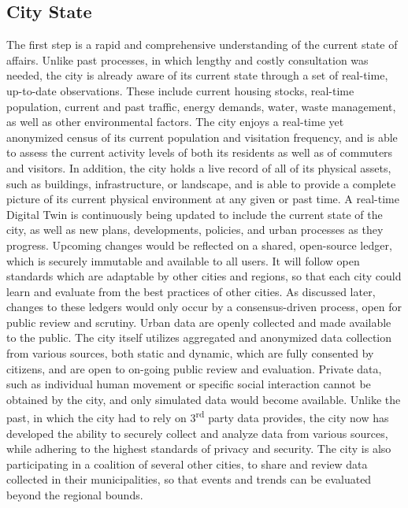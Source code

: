 {{      \subsection{City State}
      {
          The first step is a rapid and comprehensive understanding of the current state of affairs. Unlike past processes, in which lengthy and costly consultation was needed, the city is already aware of its current state through a set of real-time, up-to-date observations. These include current housing stocks, real-time population, current and past traffic, energy demands, water, waste management, as well as other environmental factors. The city enjoys a real-time yet anonymized census of its current population and visitation frequency, and is able to assess the current activity levels of both its residents as well as of commuters and visitors.
          \newline
          In addition, the city holds a live record of all of its physical assets, such as buildings, infrastructure, or landscape, and is able to provide a complete picture of its current physical environment at any given or past time. A real-time Digital Twin is continuously being updated to include the current state of the city, as well as new plans, developments, policies, and urban processes as they progress. Upcoming changes would be reflected on a shared, open-source ledger, which is securely immutable and available to all users. It will follow open standards which are adaptable by other cities and regions, so that each city could learn and evaluate from the best practices of other cities. As discussed later, changes to these ledgers would only occur by a consensus-driven process, open for public review and scrutiny.
          \newline
          Urban data are openly collected and made available to the public. The city itself utilizes aggregated and anonymized data collection from various sources, both static and dynamic, which are fully consented by citizens, and are open to on-going public review and evaluation. Private data, such as individual human movement or specific social interaction cannot be obtained by the city, and only simulated data would become available. Unlike the past, in which the city had to rely on 3\textsuperscript{rd} party data provides, the city now has developed the ability to securely collect and analyze data from various sources, while adhering to the highest standards of privacy and security. The city is also participating in a coalition of several other cities, to share and review data collected in their municipalities, so that events and trends can be evaluated beyond the regional bounds.
      }

}}
